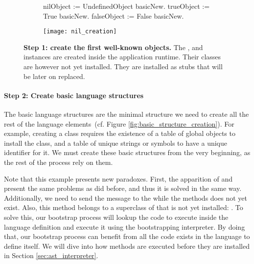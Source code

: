 \begin{figure}[ht]
\begin{subfigure}{.45\linewidth}
\begin{code}
nilObject := UndefinedObject basicNew.
trueObject := True basicNew.
falseObject := False basicNew.
\end{code}
\end{subfigure}
\begin{subfigure}{.55\linewidth}
\texttt{[image: nil\_creation]}
\end{subfigure}
\caption{\textbf{Step 1: create the first well-known objects.} The ,  and  instances are created inside the application runtime. Their classes are however not yet installed. They are installed as stubs that will be later on replaced.\label{fig:nil_creation}}
\end{figure}


\paragraph{\textbf{Step 2: Create basic language structures}}

The basic language structures are the minimal structure we need to create all the rest of the language elements~(cf. Figure \ref{fig:basic_structure_creation}). For example, creating a class requires the existence of a table of global objects to install the class, and a table of unique strings or symbols to have a unique identifier for it. We must create these basic structures from the very beginning, as the rest of the process rely on them.

Note that this example presents new paradoxes. First, the apparition of  and  present the same problems as  did before, and thus it is solved in the same way. Additionally, we need to send the  message to the  while the  methods does not yet exist. Also, this method belongs to a superclass of  that is not yet installed: . To solve this, our bootstrap process will lookup the code to execute inside the language definition and execute it using the bootstrapping interpreter. By doing that, our bootstrap process can benefit from all the code exists in the language to define itself. We will dive into how methods are executed before they are installed in Section \ref{sec:ast_interpreter}.

